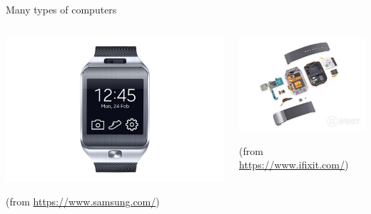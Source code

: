 \begin{frame}{Many types of computers}

  \begin{columns}[b]

    \begin{column}{.5\textwidth}

      \includegraphics[width=\textwidth]{images/samsung-gear-compressed.jpeg}

      \begin{center}
        {\tiny(from \url{https://www.samsung.com/})}
      \end{center}
    \end{column}

    \begin{column}{.5\textwidth}
      \includegraphics[width=\textwidth]{images/gear2-ifixit.jpg}

      \begin{center}
        {\tiny (from \url{https://www.ifixit.com/})}
      \end{center}
    \end{column}

  \end{columns}

\end{frame}

